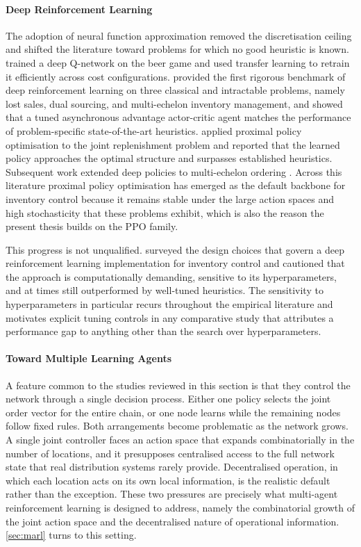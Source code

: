 \paragraph{\textbf{Deep Reinforcement Learning}}
The adoption of neural function approximation removed the discretisation ceiling and shifted the literature toward problems for which no good heuristic is known. \citet{oroojlooyjadid2022beergame} trained a deep Q-network on the beer game and used transfer learning to retrain it efficiently across cost configurations. \citet{gijsbrechts2022drl} provided the first rigorous benchmark of deep reinforcement learning on three classical and intractable problems, namely lost sales, dual sourcing, and multi-echelon inventory management, and showed that a tuned asynchronous advantage actor-critic agent matches the performance of problem-specific state-of-the-art heuristics. \citet{vanvuchelen2020ppo} applied proximal policy optimisation to the joint replenishment problem and reported that the learned policy approaches the optimal structure and surpasses established heuristics. Subsequent work extended deep policies to multi-echelon ordering \citep{kurian2022drl}. Across this literature proximal policy optimisation has emerged as the default backbone for inventory control because it remains stable under the large action spaces and high stochasticity that these problems exhibit, which is also the reason the present thesis builds on the PPO family.

This progress is not unqualified. \citet{boute2022roadmap} surveyed the design choices that govern a deep reinforcement learning implementation for inventory control and cautioned that the approach is computationally demanding, sensitive to its hyperparameters, and at times still outperformed by well-tuned heuristics. The sensitivity to hyperparameters in particular recurs throughout the empirical literature and motivates explicit tuning controls in any comparative study that attributes a performance gap to anything other than the search over hyperparameters.

\paragraph{\textbf{Toward Multiple Learning Agents}}
A feature common to the studies reviewed in this section is that they control the network through a single decision process. Either one policy selects the joint order vector for the entire chain, or one node learns while the remaining nodes follow fixed rules. Both arrangements become problematic as the network grows. A single joint controller faces an action space that expands combinatorially in the number of locations, and it presupposes centralised access to the full network state that real distribution systems rarely provide. Decentralised operation, in which each location acts on its own local information, is the realistic default rather than the exception. These two pressures are precisely what multi-agent reinforcement learning is designed to address, namely the combinatorial growth of the joint action space and the decentralised nature of operational information. \autoref{sec:marl} turns to this setting.




